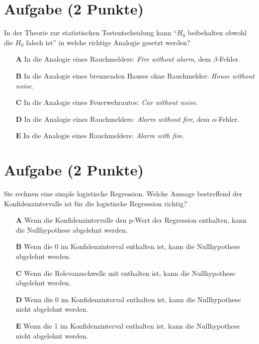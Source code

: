 \documentclass[a4paper, 10pt]{scrartcl}\usepackage[]{graphicx}\usepackage[]{xcolor}
\begin{document}
\section{Aufgabe \hfill (2 Punkte)}



In der Theorie zur statistischen Testentscheidung kann "`$H_0$ beibehalten obwohl die $H_0$ falsch ist"'
in welche richtige Analogie gesetzt werden?



\begin{enumerate}
\item [\textbf{A} \msquare] In die Analogie eines Rauchmelders: \textit{Fire without alarm}, dem $\beta$-Fehler.
\item [\textbf{B} \msquare] In die Analogie eines brennenden Hauses ohne Rauchmelder: \textit{House without noise}.
\item [\textbf{C} \msquare] In die Analogie eines Feuerwehrautos: \textit{Car without noise}.
\item [\textbf{D} \msquare] In die Analogie eines Rauchmelders: \textit{Alarm without fire}, dem $\alpha$-Fehler.
\item [\textbf{E} \msquare] In die Analogie eines Rauchmelders: \textit{Alarm with fire}.
\end{enumerate}

\section{Aufgabe \hfill (2 Punkte)}



Sie rechnen eine simple logistische Regression. Welche Aussage bestreffend der
Konfidenzintervalle ist f{\"u}r die logistische Regression richtig?



\begin{enumerate}
\item [\textbf{A} \msquare] Wenn die Konfidenzintervalle den p-Wert der Regression enthalten, kann die Nullhypothese abgelehnt werden.
\item [\textbf{B} \msquare] Wenn die 0 im Konfidenzinterval enthalten ist, kann die Nullhypothese abgelehnt werden.
\item [\textbf{C} \msquare] Wenn die Relevanzschwelle mit enthalten ist, kann die Nullhypothese abgelehnt werden.
\item [\textbf{D} \msquare] Wenn die 0 im Konfidenzinterval enthalten ist, kann die Nullhypothese nicht abgelehnt werden.
\item [\textbf{E} \msquare] Wenn die 1 im Konfidenzinterval enthalten ist, kann die Nullhypothese nicht abgelehnt werden.
\end{enumerate}
\end{document}
